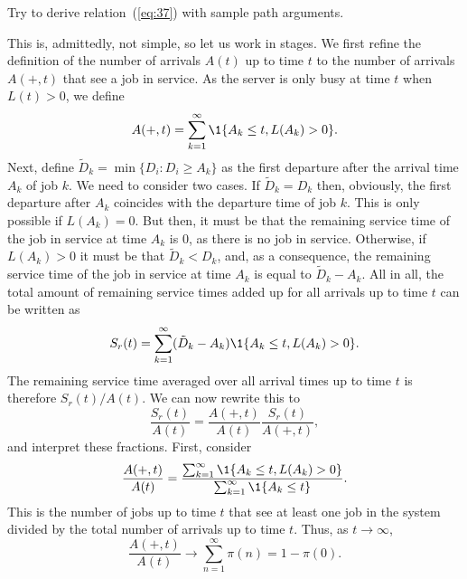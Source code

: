 \begin{question}
  Try to derive relation~(\ref{eq:37}) with sample path
  arguments. 
  \begin{solution}
    This is, admittedly, not simple, so let us work in stages. We
    first refine the definition of the number of arrivals $A(t)$ up to
    time $t$ to the number of arrivals $A(+,t)$ that see a job in
    service. As the server is only busy at time $t$ when $L(t)>0$, we define
    \begin{equation*}
      A(+,t) = \sum_{k=1}^\infty \1{A_k\leq t, L(A_k) > 0}.
    \end{equation*}
    Next, define $\tilde D_k = \min\{D_i: D_i \geq A_k\}$ as the first
    departure after the arrival time $A_k$ of job $k$. We need to
    consider two cases. If $\tilde D_k = D_k$ then, obviously, the
    first departure after $A_k$ coincides with the departure time of
    job $k$. This is only possible if $L(A_k) = 0$. But then, it must
    be that the remaining service time of the job in service at time
    $A_k$ is 0, as there is no job in service. Otherwise, if
    $L(A_k)>0$ it must be that $\tilde D_k < D_k$, and, as a
    consequence, the remaining service time of the job in service at
    time $A_k$ is equal to $\tilde D_k - A_k$. All in all, the total
    amount of remaining service times added up for all arrivals up to
    time $t$ can be written as
    \begin{equation*}
      S_r(t) = \sum_{k=1}^\infty (\tilde D_k - A_k) \1{A_k \leq t, L(A_k) > 0}.
    \end{equation*}
    The remaining service time averaged over all arrival times up to
    time $t$ is therefore $S_r(t)/A(t)$. We can now rewrite this to
\begin{equation*}
  \frac{S_r(t)}{A(t)} = 
  \frac{A(+,t)}{A(t)} \frac{S_r(t)}{A(+,t)}, 
\end{equation*}
and interpret these fractions.  First, consider
\begin{equation*}
  \frac{A(+,t)}{A(t)} = 
\frac{\sum_{k=1}^\infty \1{A_k\leq t, L(A_k) > 0}}{\sum_{k=1}^\infty \1{A_k\leq t}}.
\end{equation*}
This is the number of jobs up to time $t$ that see at least one job in
the system divided by the total number of arrivals up to time $t$. Thus, as $t\to\infty$, 
\begin{equation*}
  \frac{A(+,t)}{A(t)} \to \sum_{n=1}^\infty \pi(n) = 1-\pi(0).
\end{equation*}

\end{solution}
\end{question}
